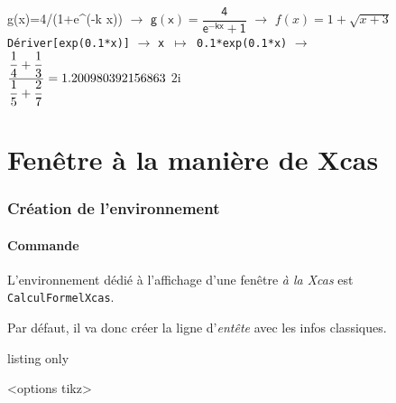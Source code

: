\documentclass[french,a4paper,11pt]{article}
\begin{document}
\begin{PresentationCode}{}
\begin{CalculFormelGeogebra}[CouleurEntete=pink!25,CouleurNumero=yellow!25,Largeur=15]
	\LigneCalculsGeogebra%
		{\sffamily g(x)=4/(1+e\textasciicircum(-k x))}
		{$\rightarrow$ \: $\mathsf{g(x)=\dfrac{4}{e^{-kx}+1}}$}
		{$\rightarrow$ \: $f(x)=1+\sqrt{x+3}$}
	\LigneCalculsGeogebra
		{\texttt{Dériver[exp(0.1*x)]}}
		{$\rightarrow$ \: \texttt{x $\mapsto$ 0.1*exp(0.1*x)}}
		{$\rightarrow$ \: $\dfrac{\dfrac14+\dfrac13}{\dfrac15+\dfrac27}=
			\fpeval{(1/4+1/3)/(1/5+2/7)}$}
		{$2\text{i}$}
\end{CalculFormelGeogebra}
\end{PresentationCode}

\pagebreak

\part{Fenêtre à la manière de Xcas}

\section{Création de l'environnement}

\subsection{Commande}

\begin{cautionblock}
L'environnement dédié à l'affichage d'une fenêtre \textit{à la Xcas} est \texttt{CalculFormelXcas}.

Par défaut, il va donc créer la ligne d'\textit{entête} avec les infos classiques.
\end{cautionblock}

\begin{PresentationCode}{listing only}
\begin{CalculFormelXcas}<options tikz>
\end{CalculFormelXcas}
\end{PresentationCode}

\begin{PresentationCode}{}
\begin{CalculFormelXcas}
\end{CalculFormelXcas}
\end{PresentationCode}
\end{document}
